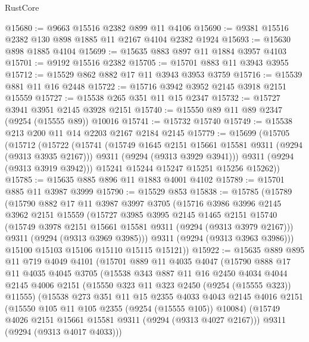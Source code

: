 \begin{lexlean}{RustCore}
\begin{coremodule}
@15680 := @9663 @15516 @2382 @899 @11 @4106
@15690 := @9381 @15516 @2382 @130 @898 @1885 @11 @2167 @4104 @2382 @1924
@15693 := @15630 @898 @1885 @4104
@15699 := @15635 @883 @897 @11 @1884 @3957 @4103
@15701 := @9192 @15516 @2382
@15705 := @15701 @883 @11 @3943 @3955
@15712 := @15529 @862 @882 @17 @11 @3943 @3953 @3759
@15716 := @15539 @881 @11 @16 @2448
@15722 := @15716 @3942 @3952 @2145 @3918 @2151 @15559
@15727 := @15538 @265 @351 @11 @15 @2347
@15732 := @15727 @3941 @3951 @2145 @3928 @2151
@15740 := @15550 @89 @11 @89 @2347 (@9254 (@15555 @89)) @10016
@15741 := @15732 @15740
@15749 := @15538 @213 @200 @11 @14 @2203 @2167 @2184 @2145
@15779 := @15699
    (@15705
      (@15712
        (@15722
          (@15741
            (@15749 @1645 @2151 @15661 @15581 @9311 (@9294 (@9313 @3935 @2167)))
            @9311
            (@9294 (@9313 @3929 @3941)))
          @9311
          (@9294 (@9313 @3919 @3942)))
        @15241
        @15244
        @15247
        @15251
        @15256
        @15262))
@15785 := @15635 @885 @896 @11 @1883 @4001 @4102
@15789 := @15701 @885 @11 @3987 @3999
@15790 := @15529 @853
@15838 := @15785
    (@15789
      (@15790
        @882
        @17
        @11
        @3987
        @3997
        @3705
        (@15716
          @3986
          @3996
          @2145
          @3962
          @2151
          @15559
          (@15727
            @3985
            @3995
            @2145
            @1465
            @2151
            @15740
            (@15749 @3978 @2151 @15661 @15581 @9311 (@9294 (@9313 @3979 @2167)))
            @9311
            (@9294 (@9313 @3969 @3985)))
          @9311
          (@9294 (@9313 @3963 @3986)))
        @15100
        @15103
        @15106
        @15110
        @15115
        @15121))
@15922 := @15635
    @889
    @895
    @11
    @719
    @4049
    @4101
    (@15701
      @889
      @11
      @4035
      @4047
      (@15790
        @888
        @17
        @11
        @4035
        @4045
        @3705
        (@15538
          @343
          @887
          @11
          @16
          @2450
          @4034
          @4044
          @2145
          @4006
          @2151
          (@15550 @323 @11 @323 @2450 (@9254 (@15555 @323)) @11555)
          (@15538
            @273
            @351
            @11
            @15
            @2355
            @4033
            @4043
            @2145
            @4016
            @2151
            (@15550 @105 @11 @105 @2355 (@9254 (@15555 @105)) @10084)
            (@15749 @4026 @2151 @15661 @15581 @9311 (@9294 (@9313 @4027 @2167)))
            @9311
            (@9294 (@9313 @4017 @4033)))

\end{coremodule}
\end{lexlean}
